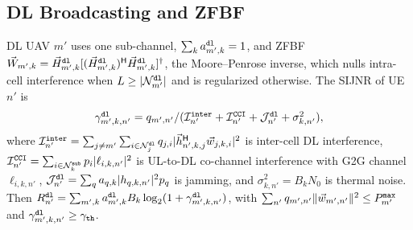 \documentclass[journal]{IEEEtran}
\begin{document}
\subsection{DL Broadcasting and ZFBF}
\label{sec:dl}
DL UAV $m'$ uses one sub-channel, $\sum_k a_{m',k}^{\tt dl}=1$, and ZFBF $\vec{W}_{m',k}=\vec{H}_{m',k}^{\tt dl}[(\vec{H}_{m',k}^{\tt dl})^{\sf H}\vec{H}_{m',k}^{\tt dl}]^{\dagger}$, the Moore--Penrose inverse, which nulls intra-cell interference when $L\ge|\mathcal{N}_{m'}^{\tt dl}|$ and is regularized otherwise. The SIJNR of UE $n'$ is
\begin{equation}
\textstyle\gamma_{m',k,n'}^{\tt dl}=q_{m',n'}/(\mathcal{I}_{n'}^{\tt inter}+\mathcal{I}_{n'}^{\tt CCI}+\mathcal{J}_{n'}^{\tt dl}+\sigma_{k,n'}^2),
\label{eq:dl_sijnr}
\end{equation}
where $\mathcal{I}_{n'}^{\tt inter}=\sum_{j\neq m'}\sum_{i\in\mathcal{N}_j^{\tt dl}}q_{j,i}|\vec{h}_{n',k,j}^{\sf H}\vec{w}_{j,k,i}|^2$ is inter-cell DL interference,
$\mathcal{I}_{n'}^{\tt CCI}=\sum_{i\in\mathcal{N}_k^{\tt sub}}p_i|\ell_{i,k,n'}|^2$ is UL-to-DL co-channel interference with G2G channel $\ell_{i,k,n'}$,
$\mathcal{J}_{n'}^{\tt dl}=\sum_{q}a_{q,k}|h_{q,k,n'}|^2 p_q$ is jamming, and
$\sigma_{k,n'}^2=B_k N_0$ is thermal noise.
Then $R_{n'}^{\tt dl}=\sum_{m',k}a_{m',k}^{\tt dl}B_k\log_2(1+\gamma_{m',k,n'}^{\tt dl})$, with $\sum_{n'}q_{m',n'}\Vert\vec{w}_{m',n'}\Vert^2\le P_{m'}^{\tt max}$ and $\gamma_{m',k,n'}^{\tt dl}\ge\gamma_{\tt th}$.
\end{document}
